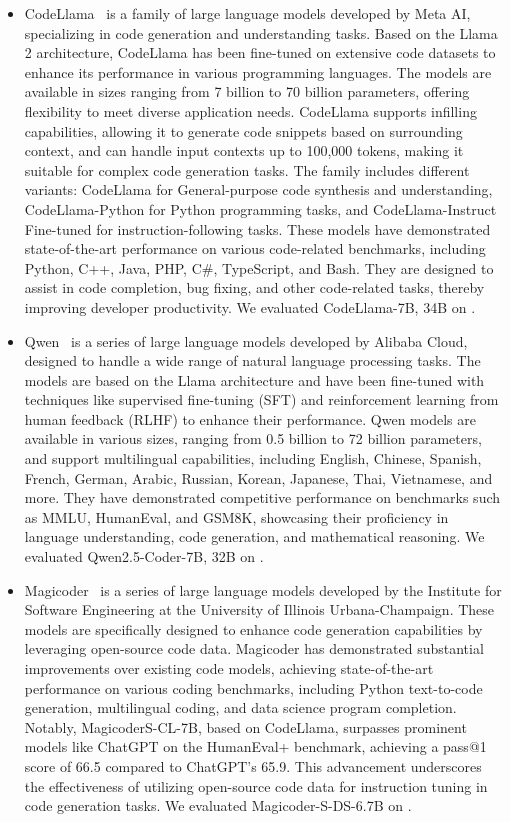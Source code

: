 \begin{itemize}[leftmargin=*]
    \item CodeLlama~\cite{roziere2023code} is a family of large language models developed by Meta AI, specializing in code generation and understanding tasks. Based on the Llama 2 architecture, CodeLlama has been fine-tuned on extensive code datasets to enhance its performance in various programming languages. The models are available in sizes ranging from 7 billion to 70 billion parameters, offering flexibility to meet diverse application needs. CodeLlama supports infilling capabilities, allowing it to generate code snippets based on surrounding context, and can handle input contexts up to 100,000 tokens, making it suitable for complex code generation tasks. The family includes different variants: CodeLlama for General-purpose code synthesis and understanding, CodeLlama-Python for Python programming tasks, and CodeLlama-Instruct Fine-tuned for instruction-following tasks. These models have demonstrated state-of-the-art performance on various code-related benchmarks, including Python, C++, Java, PHP, C\#, TypeScript, and Bash. They are designed to assist in code completion, bug fixing, and other code-related tasks, thereby improving developer productivity. We evaluated CodeLlama-{7B, 34B} on \mytitle.

    \item Qwen~\cite{bai2023qwen} is a series of large language models developed by Alibaba Cloud, designed to handle a wide range of natural language processing tasks. The models are based on the Llama architecture and have been fine-tuned with techniques like supervised fine-tuning (SFT) and reinforcement learning from human feedback (RLHF) to enhance their performance. Qwen models are available in various sizes, ranging from 0.5 billion to 72 billion parameters, and support multilingual capabilities, including English, Chinese, Spanish, French, German, Arabic, Russian, Korean, Japanese, Thai, Vietnamese, and more. They have demonstrated competitive performance on benchmarks such as MMLU, HumanEval, and GSM8K, showcasing their proficiency in language understanding, code generation, and mathematical reasoning. We evaluated Qwen2.5-Coder-{7B, 32B} on \mytitle.

    \item Magicoder~\cite{wei2023magicoder} is a series of large language models developed by the Institute for Software Engineering at the University of Illinois Urbana-Champaign. These models are specifically designed to enhance code generation capabilities by leveraging open-source code data. Magicoder has demonstrated substantial improvements over existing code models, achieving state-of-the-art performance on various coding benchmarks, including Python text-to-code generation, multilingual coding, and data science program completion. Notably, MagicoderS-CL-7B, based on CodeLlama, surpasses prominent models like ChatGPT on the HumanEval+ benchmark, achieving a pass@1 score of 66.5 compared to ChatGPT's 65.9. This advancement underscores the effectiveness of utilizing open-source code data for instruction tuning in code generation tasks. We evaluated Magicoder-S-DS-{6.7B} on \mytitle.


\end{itemize}
